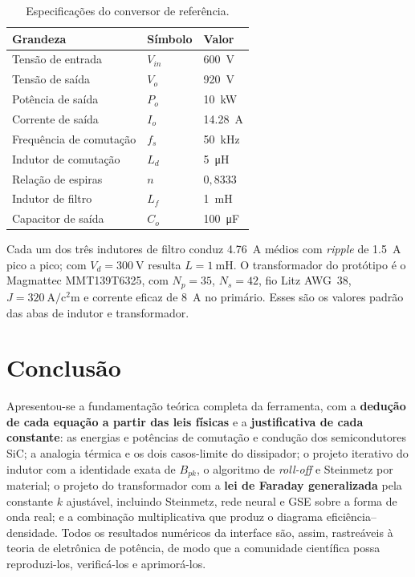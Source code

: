 \documentclass[
	a4paper, 12pt,
	chapter=TITLE, section=Title, subsection=Title,
	oneside, english, brazil, fleqn
]{abntex2}
\begin{document}
\begin{table}[htb]
	\centering
	\caption{Especificações do conversor de referência.}
	\label{tab:proto}
	\begin{tabular}{@{}lll@{}}
		\toprule
		Grandeza & Símbolo & Valor \\
		\midrule
		Tensão de entrada        & $V_{in}$ & \SI{600}{\volt} \\
		Tensão de saída          & $V_{o}$  & \SI{920}{\volt} \\
		Potência de saída        & $P_{o}$  & \SI{10}{\kilo\watt} \\
		Corrente de saída        & $I_{o}$  & \SI{14.28}{\ampere} \\
		Frequência de comutação  & $f_s$    & \SI{50}{\kilo\hertz} \\
		Indutor de comutação     & $L_d$    & \SI{5}{\micro\henry} \\
		Relação de espiras       & $n$      & $0{,}8333$ \\
		Indutor de filtro        & $L_f$    & \SI{1}{\milli\henry} \\
		Capacitor de saída       & $C_o$    & \SI{100}{\micro\farad} \\
		\bottomrule
	\end{tabular}
\end{table}

Cada um dos três indutores de filtro conduz \SI{4.76}{\ampere} médios com
\emph{ripple} de \SI{1.5}{\ampere} pico a pico; com $V_d=\SI{300}{\volt}$ resulta
$L=\SI{1}{\milli\henry}$. O transformador do protótipo é o Magmattec MMT139T6325,
com $N_p=35$, $N_s=42$, fio Litz AWG~38, $J=\SI{320}{\ampere\per\square\centi\meter}$
e corrente eficaz de \SI{8}{\ampere} no primário. Esses são os valores padrão das
abas de indutor e transformador.

\chapter{Conclusão}
Apresentou-se a fundamentação teórica completa da ferramenta, com a
\textbf{dedução de cada equação a partir das leis físicas} e a
\textbf{justificativa de cada constante}: as energias e potências de comutação e
condução dos semicondutores SiC; a analogia térmica e os dois casos-limite do
dissipador; o projeto iterativo do indutor com a identidade exata de $B_{pk}$, o
algoritmo de \emph{roll-off} e Steinmetz por material; o projeto do transformador
com a \textbf{lei de Faraday generalizada} pela constante $k$ ajustável,
incluindo Steinmetz, rede neural e GSE sobre a forma de onda real; e a combinação multiplicativa que produz
o diagrama eficiência--densidade. Todos os resultados numéricos da interface são,
assim, rastreáveis à teoria de eletrônica de potência, de modo que a comunidade
científica possa reproduzi-los, verificá-los e aprimorá-los.
\end{document}
